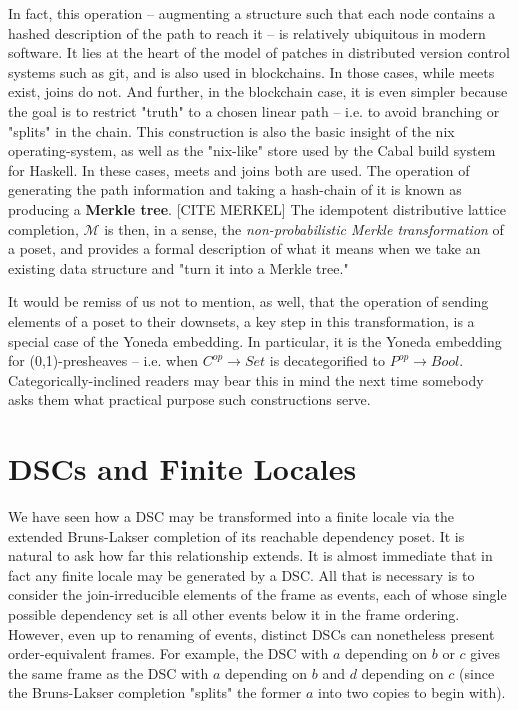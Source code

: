\documentclass[hoptionsi,review,format=acmsmall]{acmart}
\theoremstyle{definition}
\newcommand{\Mcc}{\mathcal{M}}
\begin{document}
In fact, this operation -- augmenting a structure such that each node contains a hashed description of the path to reach it -- is relatively ubiquitous in modern software. It lies at the heart of the model of patches in distributed version control systems such as git, and is also used in blockchains. In those cases, while meets exist, joins do not. And further, in the blockchain case, it is even simpler because the goal is to restrict "truth" to a chosen linear path -- i.e. to avoid branching or "splits" in the chain. This construction is also the basic insight of the nix operating-system, as well as the "nix-like" store used by the Cabal build system for Haskell. In these cases, meets and joins both are used. The operation of generating the path information and taking a hash-chain of it is known as producing a \textbf{Merkle tree}. [CITE MERKEL] The idempotent distributive lattice completion, \(\Mcc\) is then, in a sense, the \textit{non-probabilistic Merkle transformation} of a poset, and provides a formal description of what it means when we take an existing data structure and "turn it into a Merkle tree."

It would be remiss of us not to mention, as well, that the operation of sending elements of a poset to their downsets, a key step in this transformation, is a special case of the Yoneda embedding. In particular, it is the Yoneda embedding for (0,1)-presheaves -- i.e. when \(C^{op} \rightarrow Set\) is decategorified to \(P^{op} \rightarrow Bool\). Categorically-inclined readers may bear this in mind the next time somebody asks them what practical purpose such constructions serve.


\section{DSCs and Finite Locales}

We have seen how a DSC may be transformed into a finite locale via the extended Bruns-Lakser completion of its reachable dependency poset. It is natural to ask how far this relationship extends. It is almost immediate that in fact any finite locale may be generated by a DSC. All that is necessary is to consider the join-irreducible elements of the frame as events, each of whose single possible dependency set is all other events below it in the frame ordering. However, even up to renaming of events, distinct DSCs can nonetheless present order-equivalent frames. For example, the DSC with \(a\) depending on \(b\) or \(c\) gives the same frame as the DSC with \(a\) depending on \(b\) and \(d\) depending on \(c\) (since the Bruns-Lakser completion "splits" the former \(a\) into two copies to begin with). 
\end{document}
